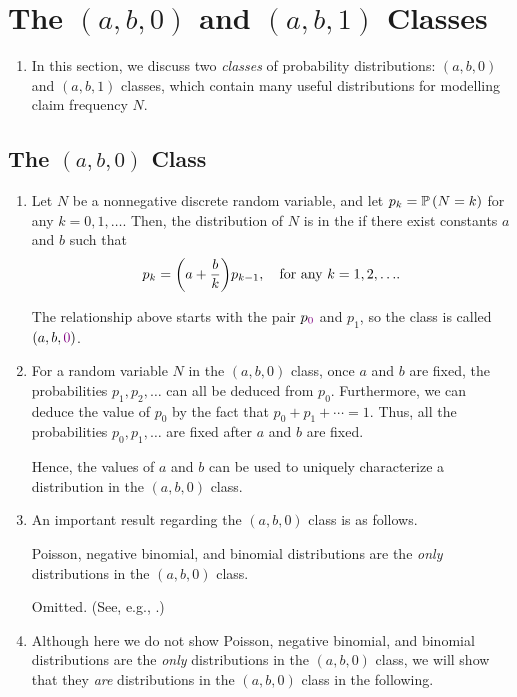 \section{The \((a,b,0)\) and \((a,b,1)\) Classes}
\label{sect:ab0-ab1-classes}
\begin{enumerate}
\item In this section, we discuss two \emph{classes} of probability
distributions: \((a,b,0)\) and \((a,b,1)\) classes, which contain many useful
distributions for modelling claim frequency \(N\).
\end{enumerate}
\subsection{The \((a,b,0)\) Class}
\begin{enumerate}
\item Let \(N\) be a nonnegative discrete random variable, and let
\(p_k=\mathbb{P}\left(N=k\right)\) for any \(k=0,1,\dotsc\). Then, the distribution of \(N\) is in
the  if there exist constants \(a\) and \(b\) such that
\[
p_k=\qty(a+\frac{b}{k})p_{k-1},\quad\text{for any \(k=1,2,\dotsc\)}.
\]
\begin{note}
The relationship above starts with the pair \(p_{\color{violet} 0}\) and
\(p_1\), so the class is called \((a,b,{\color{violet}0})\).
\end{note}

\item For a random variable \(N\) in the \((a,b,0)\) class, once \(a\) and
\(b\) are fixed, the probabilities \(p_1,p_2,\dotsc\) can all be deduced from
\(p_0\). Furthermore, we can deduce the value of \(p_0\) by the fact that
\(p_0+p_1+\dotsb=1\). Thus, all the probabilities \(p_0,p_1,\dotsc\) are fixed
after \(a\) and \(b\) are fixed.

Hence, the values of \(a\) and \(b\) can be used to uniquely characterize a
distribution in the \((a,b,0)\) class.

\item An important result regarding the \((a,b,0)\) class is as follows.
\begin{theorem}
\label{thm:ab0-dist}
Poisson, negative binomial, and binomial distributions are the \emph{only}
distributions in the \((a,b,0)\) class.
\end{theorem}
\begin{pf}
Omitted. (See, e.g., \textcite{sundt1981further}.)
\end{pf}
\item Although here we do not show Poisson, negative binomial, and binomial
distributions are the \emph{only} distributions in the \((a,b,0)\) class, we
will show that they \emph{are} distributions in the \((a,b,0)\) class in the
following.


\end{enumerate}
